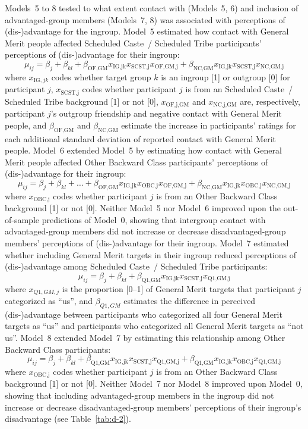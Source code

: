 \documentclass[12pt, a4paper]{article}
\begin{document}
Models~5 to 8 tested to what extent contact with (Models~5, 6) and inclusion of advantaged-group members (Models~7, 8) was associated with perceptions of (dis-)advantage for the ingroup. Model~5 estimated how contact with General Merit people affected Scheduled Caste~/ Scheduled Tribe participants' perceptions of (dis-)advantage for their ingroup: $$ \mu_{ij} = \beta_{j} + \beta_{kl} + \beta_\text{OF,GM}x_{\text{IG,jk}}x_{\text{SCST,j}}x_\text{OF,GM,j} + \beta_\text{NC,GM}x_{\text{IG,jk}}x_{\text{SCST,j}}x_\text{NC,GM,j} $$ where $x_{\text{IG},jk}$ codes whether target group $k$ is an ingroup [1] or outgroup [0] for participant $j$, $x_{\text{SCST,j}}$ codes whether participant $j$ is from an Scheduled Caste~/ Scheduled Tribe background [1] or not [0], $x_\text{OF,j,GM}$ and $x_\text{NC,j,GM}$ are, respectively, participant $j$'s outgroup friendship and negative contact with General Merit people, and $\beta_\text{OF,GM}$ and $\beta_\text{NC,GM}$ estimate the increase in participants' ratings for each additional standard deviation of reported contact with General Merit people. Model~6 extended Model~5 by estimating how contact with General Merit people affected Other Backward Class participants' perceptions of (dis-)advantage for their ingroup: $$ \mu_{ij} = \beta_{j} + \beta_{kl} + \ldots + \beta_\text{OF,GM}x_{\text{IG,jk}}x_{\text{OBC,j}}x_\text{OF,GM,j} + \beta_\text{NC,GM}x_{\text{IG,jk}}x_{\text{OBC,j}}x_\text{NC,GM,j} $$ where $x_{\text{OBC,j}}$ codes whether participant $j$ is from an Other Backward Class background [1] or not [0]. Neither Model~5 nor Model~6 improved upon the out-of-sample predictions of Model~0, showing that intergroup contact with advantaged-group members did not increase or decrease disadvantaged-group members' perceptions of (dis-)advantage for their ingroup. Model~7 estimated whether including General Merit targets in their ingroup reduced perceptions of (dis-)advantage among Scheduled Caste~/ Scheduled Tribe participants: $$ \mu_{ij} = \beta_{j} + \beta_{kl} + \beta_\text{Q1,GM}x_{\text{IG,jk}}x_{\text{SCST,j}}x_\text{Q1,GM,j} $$ where $x_{Q1,GM,j}$ is the proportion [0--1] of General Merit targets that participant $j$ categorized as ``us'', and $\beta_{Q1,GM}$ estimates the difference in perceived (dis-)advantage between participants who categorized all four General Merit targets as ``us'' and participants who categorized all General Merit targets as ``not us''. Model~8 extended Model~7 by estimating this relationship among Other Backward Class participants: $$ \mu_{ij} = \beta_{j} + \beta_{kl} + \beta_\text{Q1,GM}x_{\text{IG,jk}}x_{\text{SCST,j}}x_\text{Q1,GM,j} + \beta_\text{Q1,GM}x_{\text{IG,jk}}x_{\text{OBC,j}}x_\text{Q1,GM,j} $$ where $x_{\text{OBC,j}}$ codes whether participant $j$ is from an Other Backward Class background [1] or not [0]. Neither Model~7 nor Model~8 improved upon Model~0, showing that including advantaged-group members in the ingroup did not increase or decrease disadvantaged-group members' perceptions of their ingroup's disadvantage (see Table~\ref{tab:d-2}).
\end{document}
